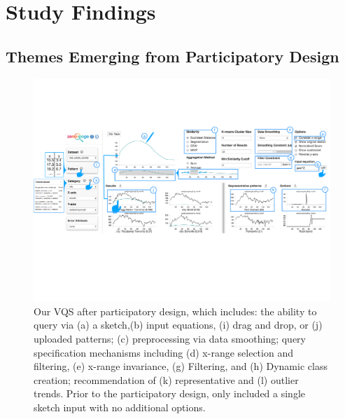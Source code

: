 \section{Study Findings}
\subsection{Themes Emerging from Participatory Design\label{pd_findings}}
\begin{figure}[ht!]
\centering
\vspace{-15pt}
\includegraphics[width=\linewidth]{figures/system.pdf} %
\vspace{-5pt}\caption{Our VQS after participatory design, which includes: the ability to query via (a) a sketch,(b) input equations, (i) drag and drop, or (j) uploaded patterns; (c) preprocessing via data smoothing; query specification mechanisms including (d) x-range selection and filtering, (e) x-range invariance, (g) Filtering, and (h) Dynamic class creation; recommendation of (k) representative and (l) outlier trends. Prior to the participatory design, \zv only included a single sketch input with no additional options.}
\label{zvOverview}
\vspace{-14pt}
\end{figure}


